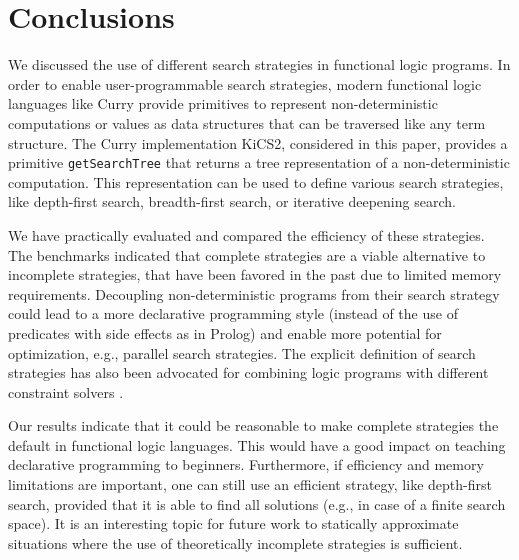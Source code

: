 \documentclass[english]{lni}
\newcommand{\code}[1]{\texttt{\small{}#1}}
\begin{document}
\section{Conclusions}
\label{sec:conclusions}

We discussed the use of different search strategies
in functional logic programs.
In order to enable user-programmable search strategies,
modern functional logic languages like Curry
provide primitives to represent non-deterministic computations
or values as data structures that can be traversed like
any term structure.
The Curry implementation KiCS2, considered in this paper,
provides a primitive \code{getSearchTree}
that returns a tree representation of a non-deterministic computation.
This representation can be used to define various search strategies,
like depth-first search, breadth-first search, or iterative deepening
search.

We have practically evaluated and compared
the efficiency of these strategies.
The benchmarks indicated that complete strategies
are a viable alternative to incomplete strategies,
that have been favored in the past due to limited memory requirements.
Decoupling non-deterministic programs
from their search strategy could lead to a more declarative
programming style (instead of the use of predicates with
side effects as in Prolog) and enable more potential for
optimization, e.g., parallel search strategies.
The explicit definition of search strategies
has also been advocated for combining logic programs
with different constraint solvers
\cite{FrankHofstedtPepperReckmann06,Schulte97CP}.

Our results indicate that it could be reasonable to make
complete strategies the default in functional logic languages.
This would have a good impact on teaching declarative programming
to beginners.
Furthermore, if efficiency and memory limitations are important,
one can still use an efficient strategy, like depth-first search,
provided that it is able to find all solutions
(e.g., in case of a finite search space).
It is an interesting topic for future work
to statically approximate situations where
the use of theoretically incomplete strategies is sufficient.


%

\end{document}
